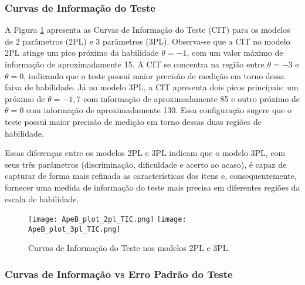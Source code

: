 
\subsubsection{Curvas de Informação do Teste}\label{sec:apeB_cit}

A Figura \ref{fig:ApeB_plot_TIC} apresenta as Curvas de Informação do Teste (CIT) para os modelos de 2 parâmetros (2PL) e 3 parâmetros (3PL). Observa-se que a CIT no modelo 2PL atinge um pico próximo da habilidade $\theta = -1$, com um valor máximo de informação de aproximadamente 15. A CIT se concentra na região entre $\theta = -3$ e $\theta = 0$, indicando que o teste possui maior precisão de medição em torno dessa faixa de habilidade. Já no modelo 3PL, a CIT apresenta dois picos principais: um próximo de $\theta = -1,7$ com informação de aproximadamente 85 e outro próximo de $\theta = 0$ com informação de aproximadamente 130. Essa configuração sugere que o teste possui maior precisão de medição em torno dessas duas regiões de habilidade.

Essas diferenças entre os modelos 2PL e 3PL indicam que o modelo 3PL, com seus três parâmetros (discriminação, dificuldade e acerto ao acaso), é capaz de capturar de forma mais refinada as características dos itens e, consequentemente, fornecer uma medida de informação do teste mais precisa em diferentes regiões da escala de habilidade.

\begin{figure}[!ht]
    \centering
    \texttt{[image: ApeB\_plot\_2pl\_TIC.png]}
    \texttt{[image: ApeB\_plot\_3pl\_TIC.png]}
    \caption{Curvas de Informação do Teste nos modelos 2PL e 3PL.}
    \label{fig:ApeB_plot_TIC}
    \end{figure}
    

\subsubsection{Curvas de Informação vs Erro Padrão do Teste}\label{sec:apeB_TIC_SE}

